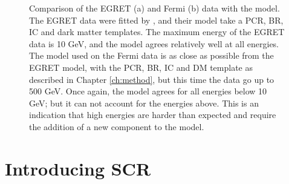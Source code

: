 \begin{figure}[h]
  \caption[Comparison of EGRET and Fermi results]{Comparison of the EGRET (a) and Fermi (b) data with the model. The EGRET data were fitted by \cite{deBoer2006}, and their model take a PCR, BR, IC and dark matter templates. The maximum energy of the EGRET data is 10 GeV, and the model agrees relatively well at all energies. The model used on the Fermi data is as close as possible from the EGRET model, with the PCR, BR, IC and DM template as described in Chapter \ref{ch:method}, but this time the data go up to 500 GeV. Once again, the model agrees for all energies below 10 GeV; but it can not account for the energies above. This is an indication that high energies are harder than expected and require the addition of a new component to the model.}
  \label{fig:EGRET_comp}
\end{figure}


\newpage
\section{Introducing SCR}


